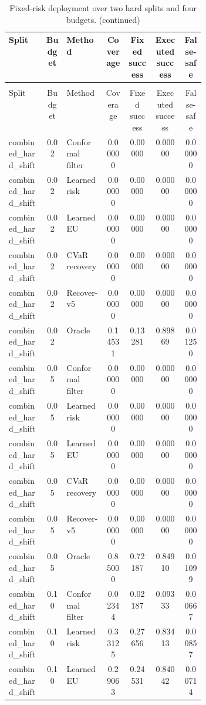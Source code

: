 \documentclass{article}
\begin{document}
\begin{center}
\scriptsize
\begin{longtable}{p{0.19\linewidth}cp{0.20\linewidth}cccc}
\caption{Fixed-risk deployment over two hard splits and four budgets.}\label{tab:fixed-risk}\\
\toprule
Split & Budget & Method & Coverage & Fixed success & Executed success & False-safe\\
\midrule
\endfirsthead
\caption[]{Fixed-risk deployment over two hard splits and four budgets. (continued)}\\
\toprule
Split & Budget & Method & Coverage & Fixed success & Executed success & False-safe\\
\midrule
\endhead
combined\_hard\_shift & 0.02 & Conformal filter & 0.00000 & 0.00000 & 0.00000 & 0.00000\\
combined\_hard\_shift & 0.02 & Learned risk & 0.00000 & 0.00000 & 0.00000 & 0.00000\\
combined\_hard\_shift & 0.02 & Learned EU & 0.00000 & 0.00000 & 0.00000 & 0.00000\\
combined\_hard\_shift & 0.02 & CVaR recovery & 0.00000 & 0.00000 & 0.00000 & 0.00000\\
combined\_hard\_shift & 0.02 & Recover-v5 & 0.00000 & 0.00000 & 0.00000 & 0.00000\\
combined\_hard\_shift & 0.02 & Oracle & 0.14531 & 0.13281 & 0.89869 & 0.01250\\
combined\_hard\_shift & 0.05 & Conformal filter & 0.00000 & 0.00000 & 0.00000 & 0.00000\\
combined\_hard\_shift & 0.05 & Learned risk & 0.00000 & 0.00000 & 0.00000 & 0.00000\\
combined\_hard\_shift & 0.05 & Learned EU & 0.00000 & 0.00000 & 0.00000 & 0.00000\\
combined\_hard\_shift & 0.05 & CVaR recovery & 0.00000 & 0.00000 & 0.00000 & 0.00000\\
combined\_hard\_shift & 0.05 & Recover-v5 & 0.00000 & 0.00000 & 0.00000 & 0.00000\\
combined\_hard\_shift & 0.05 & Oracle & 0.85000 & 0.72187 & 0.84910 & 0.01099\\
combined\_hard\_shift & 0.10 & Conformal filter & 0.02344 & 0.02187 & 0.09333 & 0.00667\\
combined\_hard\_shift & 0.10 & Learned risk & 0.33125 & 0.27656 & 0.83413 & 0.00857\\
combined\_hard\_shift & 0.10 & Learned EU & 0.29063 & 0.24531 & 0.84042 & 0.00714\\

\end{longtable}
\end{center}
\end{document}
